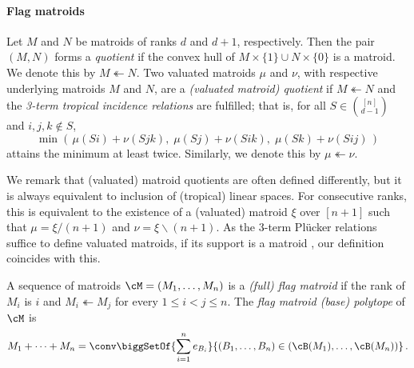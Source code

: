 \paragraph{Flag matroids} Let $M$ and $N$ be matroids of ranks $d$ and $d+1$, respectively.
Then the pair $(M,N)$ forms a \emph{quotient} if the convex hull of $M\times\{1\}\cup N\times\{0\}$ is a matroid. 
We denote this by $M \twoheadleftarrow N$.  
Two valuated matroids $\mu$ and $\nu$, with respective underlying matroids $M$ and $N$, are a \emph{(valuated matroid) quotient} if $M \twoheadleftarrow N$ and the \emph{3-term tropical incidence relations} are fulfilled; that is, for all $S\in\binom{[n]}{d-1}$ and $i,j,k \notin S$, 
\begin{equation} \label{eq:3-term-incidence} \tag{3TIR}
\min (\,\mu(Si) +\nu(Sjk),\; \mu(Sj) +\nu(Sik),\; \mu(Sk) +\nu(Sij) \,)
\end{equation}
attains the minimum at least twice.
Similarly, we denote this by $\mu \twoheadleftarrow \nu$.

We remark that (valuated) matroid quotients are often defined differently, but it is always equivalent to inclusion of (tropical) linear spaces. 
For consecutive ranks, this is equivalent to the existence of a (valuated) matroid $\xi$ over $[n+1]$ such that $\mu=\xi / (n+1)$ and $\nu = \xi \backslash (n+1)$. 
As the 3-term Pl\"ucker relations suffice to define valuated matroids, if its support is a matroid \cite[Corollary 5.5]{Rincon:2012}, our definition coincides with this.

A sequence of matroids $\cM = (M_{1},\ldots,M_{n})$ 
is a \emph{(full) flag matroid} if the rank of $M_i$ is $i$ and $M_{i}\twoheadleftarrow M_{j}$ for every $1\leq i<j\leq n$.
The \emph{flag matroid (base) polytope} of $\cM$ is 
\begin{equation*}
	M_1 + \dots + M_n = \conv\biggSetOf{\sum_{i=1}^{n}e_{B_i}}{(B_1,\dots,B_n) \in (\cB(M_{1}),\ldots,\cB(M_{n}))} \,.
\end{equation*}




